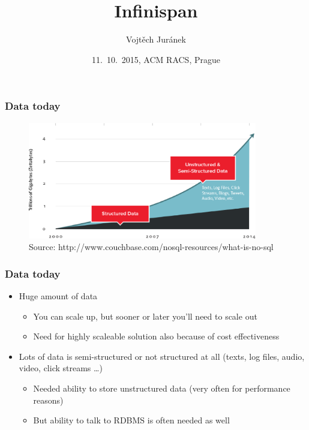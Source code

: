 \documentclass[10pt,utf8]{beamer}
\title{Infinispan}
\author{Vojtěch Juránek}
\institute[Red Hat]{JBoss - a division by Red Hat}
\date{11.~10.~2015, ACM RACS, Prague}
\begin{document}


\begin{frame}
 \titlepage
\end{frame}

\begin{frame}
	\frametitle{Data today}
	\begin{figure}
		\centering
		\includegraphics[width=10cm]{./img/why-nosql-2.eps}
		\caption{\tiny{Source: http://www.couchbase.com/nosql-resources/what-is-no-sql}}
	\end{figure}
\end{frame}

\begin{frame}
	\frametitle{Data today}
	\begin{itemize}
		\item Huge amount of data
		\begin{itemize}
			\item You can scale up, but sooner or later you'll need to scale out
			\item Need for highly scaleable solution also because of cost effectiveness
		\end{itemize}
		\item Lots of data is semi-structured or not structured at all (texts, log files, audio, video, click streams \dots)
		\begin{itemize}
			\item Needed ability to store unstructured data (very often for performance reasons)
			\item But ability  to talk to RDBMS is often needed as well
		\end{itemize}
	\end{itemize}
\end{frame}
\end{document}
